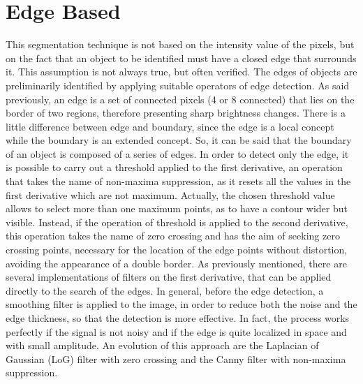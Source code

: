 \documentclass[final,a4paper,12pt,english]{UnicaPhdThesis3}
\begin{document}
\section{Edge Based} %
This segmentation technique is not based on the intensity value of the pixels, but on the fact that an object to be identified must have a closed edge that surrounds it. This assumption is not always true, but often verified. The edges of objects are preliminarily identified by applying suitable operators of edge detection. As said previously, an edge is a set of connected pixels (4 or 8 connected) that lies on the border of two regions, therefore presenting sharp brightness changes. There is a little difference between edge and boundary, since the edge is a local concept while the boundary is an extended concept. So, it can be said that the boundary of an object is composed of a series of edges.
In order to detect only the edge, it is possible to carry out a threshold applied to the first derivative, an operation that takes the name of non-maxima suppression, as it resets all the values ​​in the first derivative which are not maximum. Actually, the chosen threshold value allows to select more than one maximum points, as to have a contour wider but visible. Instead, if the operation of threshold is applied to the second derivative, this operation takes the name of zero crossing and has the aim of seeking zero crossing points, necessary for the location of the edge points without distortion, avoiding the appearance of a double border. As previously mentioned, there are several implementations of filters on the first derivative, that can be applied directly to the search of the edges. In general, before the edge detection, a smoothing filter is applied to the image, in order to reduce both the noise and the edge thickness, so that the detection is more effective. In fact, the process works perfectly if the signal is not noisy and if the edge is quite localized in space and with small amplitude. An evolution of this approach are the Laplacian of Gaussian (\acs{LoG}) filter with zero crossing and the Canny filter with non-maxima suppression.
\end{document}
